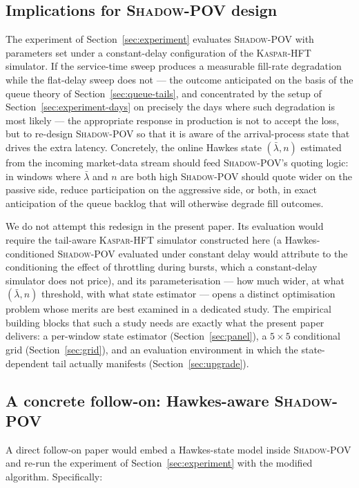 \documentclass[11pt]{article}
\newcommand{\kasparhft}{\textsc{Kaspar-HFT}}
\newcommand{\shadowpov}{\textsc{Shadow-POV}}
\begin{document}
\subsection{Implications for \shadowpov{} design}
\label{sec:future-shadow-design}

The experiment of Section~\ref{sec:experiment} evaluates \shadowpov{} with parameters set under a constant-delay configuration of the \kasparhft{} simulator. If the service-time sweep produces a measurable fill-rate degradation while the flat-delay sweep does not --- the outcome anticipated on the basis of the queue theory of Section~\ref{sec:queue-tails}, and concentrated by the setup of Section~\ref{sec:experiment-days} on precisely the days where such degradation is most likely --- the appropriate response in production is not to accept the loss, but to re-design \shadowpov{} so that it is aware of the arrival-process state that drives the extra latency. Concretely, the online Hawkes state $(\bar\lambda, n)$ estimated from the incoming market-data stream should feed \shadowpov{}'s quoting logic: in windows where $\bar\lambda$ and $n$ are both high \shadowpov{} should quote wider on the passive side, reduce participation on the aggressive side, or both, in exact anticipation of the queue backlog that will otherwise degrade fill outcomes.

We do not attempt this redesign in the present paper. Its evaluation would require the tail-aware \kasparhft{} simulator constructed here (a Hawkes-conditioned \shadowpov{} evaluated under constant delay would attribute to the conditioning the effect of throttling during bursts, which a constant-delay simulator does not price), and its parameterisation --- how much wider, at what $(\bar\lambda, n)$ threshold, with what state estimator --- opens a distinct optimisation problem whose merits are best examined in a dedicated study. The empirical building blocks that such a study needs are exactly what the present paper delivers: a per-window state estimator (Section~\ref{sec:panel}), a $5 \times 5$ conditional grid (Section~\ref{sec:grid}), and an evaluation environment in which the state-dependent tail actually manifests (Section~\ref{sec:upgrade}).

\subsection{A concrete follow-on: Hawkes-aware \shadowpov{}}
\label{sec:future-shadow-follow}

A direct follow-on paper would embed a Hawkes-state model inside \shadowpov{} and re-run the experiment of Section~\ref{sec:experiment} with the modified algorithm. Specifically:
\end{document}
